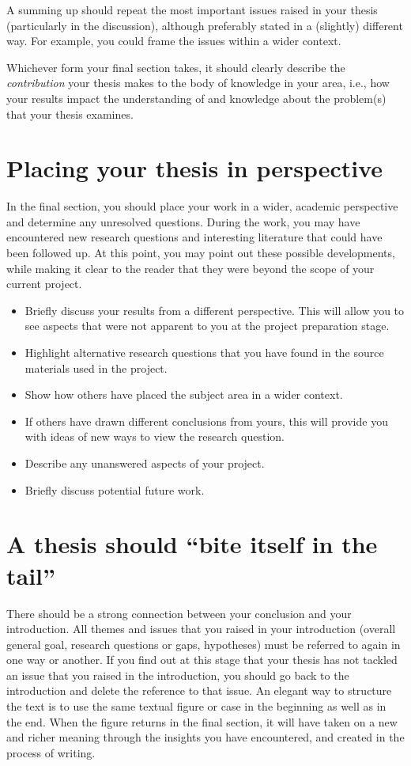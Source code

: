 \documentclass[a4paper,twoside]{bth}
\begin{document}
A summing up should repeat the most important issues raised in your thesis (particularly in the discussion), although preferably stated in a (slightly) different way. For example, you could frame the issues within a wider context.

Whichever form your final section takes, it should clearly describe the \emph{contribution} your thesis makes to the body of knowledge in your area, i.e., how your results impact the understanding of and knowledge about the problem(s) that your thesis examines.


\section{Placing your thesis in perspective}
In the final section, you should place your work in a wider, academic perspective and determine any unresolved questions. During the work, you may have encountered new research questions and interesting literature that could have been followed up. At this point, you may point out these possible developments, while making it clear to the reader that they were beyond the scope of your current project.

\begin{itemize}
    \item Briefly discuss your results from a different perspective. This will allow you to see aspects that were not apparent to you at the project preparation stage.
    \item Highlight alternative research questions that you have found in the source materials used in the project.
    \item Show how others have placed the subject area in a wider context.
    \item If others have drawn different conclusions from yours, this will provide you with ideas of new ways to view the research question.
    \item Describe any unanswered aspects of your project.
    \item Briefly discuss potential future work. 
\end{itemize}
 
    
\section{A thesis should ``bite itself in the tail''}
There should be a strong connection between your conclusion and your introduction. All themes and issues that you raised in your introduction (overall general goal, research questions or gaps, hypotheses) must be referred to again in one way or another. If you find out at this stage that your thesis has not tackled an issue that you raised in the introduction, you should go back to the introduction and delete the reference to that issue. An elegant way to structure the text is to use the same textual figure or case in the beginning as well as in the end. When the figure returns in the final section, it will have taken on a new and richer meaning through the insights you have encountered, and created in the process of writing.
\end{document}
